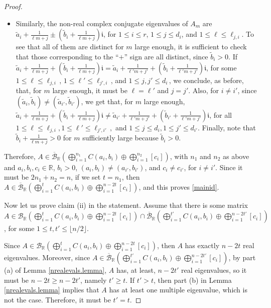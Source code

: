 \documentclass[10pt,a4paper]{amsart}
\newcommand{\R}{\mathbb R}
\newcommand{\bunr}{{\mathcal B}_{\R}}
\newcommand{\cbunr}{{\overline{\mathcal B}}_{\R}}
\newcommand{\ii}{\mathfrak i}
\begin{document}
\begin{proof}
\begin{itemize}
    \item Similarly, the non-real complex conjugate eigenvalues of $A_m$ are $\tilde a_i+\frac{1}{\ell m+j} \pm (\tilde b_i+\frac{1}{\ell m+j})\ii$, for $1\leq i\leq r$, $1\leq j\leq d_i$, and $1\leq \ell\leq\ell_{j,i}$. To see that all of them are distinct for $m$ large enough, it is sufficient to check that those corresponding to the ``$+$'' sign are all distinct, since $\widetilde b_i >0$. If $\tilde a_i+\frac{1}{\ell m+j}+ (\tilde b_i+\frac{1}{\ell m+j})\ii= \tilde a_{i}+\frac{1}{\ell'm+j'}+ (\tilde b_{i}+\frac{1}{\ell'm+j'})\ii$, for some $1\leq \ell \leq \ell_{j,i}\,$,  $1\leq \ell' \leq \ell_{j',i}\,$, and $1\leq j,j'\leq d_i\,$, we conclude, as before, that, for $m$ large enough, it must be $\ell=\ell'$ and $j=j'$. Also, for $i \ne i'$, since $(\tilde a_i, \tilde b_i )\neq (\tilde a_{i'}, \tilde b_{i'})$, we get that, for $m$ large enough, $\tilde a_i+\frac{1}{\ell m+j}+ (\tilde b_i+\frac{1}{\ell m+j})\ii\neq \tilde a_{i'}+\frac{1}{\ell'm+j'}+ (\tilde b_{i'}+\frac{1}{\ell'm+j'})\ii$, for all $1\leq \ell\leq\ell_{j,i},1\leq\ell'\leq \ell_{j',i'}\,,$ and $1\leq j\leq d_i,1\leq j'\leq d_{i'}$. Finally, note that $\tilde b_i+\frac{1}{\ell m+j} > 0$ for $m$ sufficiently large because $\tilde b_i > 0$.
\end{itemize}
Therefore, $A\in \cbunr \left(\bigoplus_{i=1}^{n_1}C(a_i,b_i)\oplus \bigoplus_{i=1}^{n_2}[c_i]\right)$, with $n_1$ and $n_2$ as above and $a_i,b_i,c_i\in\R$, $b_i >0$, $(a_i,b_i) \neq (a_{i'}, b_{i'})$, and $c_i\neq c_{i'}$, for $i\neq i'$. Since it must be $2n_1+n_2=n$, if we set $t=n_1$, then $A\in \cbunr \left(\bigoplus_{i=1}^tC(a_i,b_i)\oplus\bigoplus_{i=1}^{n-2t}[c_i]\right)$, and this proves \eqref{mainid}.

Now let us prove claim (ii) in the statement. Assume that there is some matrix $A\in\bunr \left(\bigoplus_{i=1}^tC(a_i,b_i)\oplus\bigoplus_{i=1}^{n-2t}[c_i]\right)\cap\cbunr \left(\bigoplus_{i=1}^{t'}C(a_i,b_i)\oplus\bigoplus_{i=1}^{n-2t'}[c_i]\right)$, for some $1\leq t,t'\leq\lfloor n/2\rfloor$.

Since $A\in\bunr \left(\bigoplus_{i=1}^tC(a_i,b_i)\oplus\bigoplus_{i=1}^{n-2t}[c_i]\right)$, then $A$ has exactly $n-2t$ real eigenvalues. Moreover, since $A\in\cbunr \left(\bigoplus_{i=1}^{t'}C(a_i,b_i)\oplus\bigoplus_{i=1}^{n-2t'}[c_i]\right)$, %
by part (a) of Lemma \ref{nrealevals.lemma}, $A$ has, at least, $n-2t'$ real eigenvalues, so it must be $n-2t\geq n-2t'$, namely $t'\geq t$. If $t'>t$, then part (b) in Lemma \ref{nrealevals.lemma} implies that $A$ has at least one multiple eigenvalue, which is not the case. Therefore, it must be $t'=t$.



\end{proof}
\end{document}
